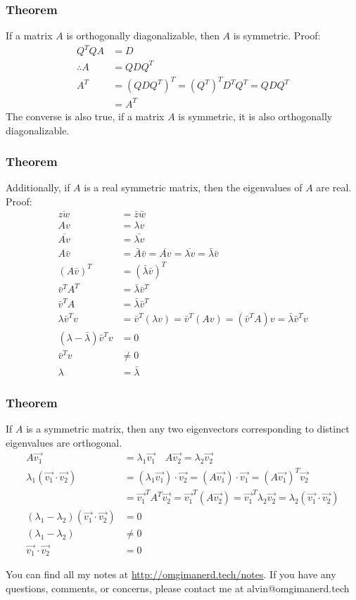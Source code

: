 \documentclass{math}
\begin{document}
\subsubsection*{Theorem}
If a matrix \( A \) is orthogonally diagonalizable, then \( A \) is symmetric.
Proof:
\begin{align*}
  Q^TQA &= D \\
  \therefore A &= QDQ^T \\
  A^T &= (QDQ^T)^T = (Q^T)^TD^TQ^T = QDQ^T \\
  &= A^T
\end{align*}
The converse is also true, if a matrix \( A \) is symmetric, it is also
orthogonally diagonalizable.

\subsubsection*{Theorem}
Additionally, if \( A \) is a real symmetric matrix, then the eigenvalues of
\( A \) are real. Proof:
\begin{align*}
  \overline{zw} &= \bar{z}\bar{w} \\
  Av &= \lambda v \\
  \overline{Av} &= \bar{\lambda v} \\
  A\bar{v} &= \bar{A}\bar{v} = \overline{Av} = \overline{\lambda v} =
    \bar{\lambda}\bar{v} \\
  (A\bar{v})^T &= (\bar{\lambda}\bar{v})^T \\
  \bar{v}^TA^T &= \bar{\lambda}\bar{v}^T \\
  \bar{v}^TA &= \bar{\lambda}\bar{v}^T \\
  \lambda\bar{v}^Tv &= \bar{v}^T(\lambda v) = \bar{v}^T(Av) = (\bar{v}^TA)v =
    \bar{\lambda}\bar{v}^Tv \\
  (\lambda-\bar{\lambda})\bar{v}^Tv &= 0 \\
  \bar{v}^Tv &\ne 0 \\
  \lambda &= \bar{\lambda}
\end{align*}

\subsubsection*{Theorem}
If \( A \) is a symmetric matrix, then any two eigenvectors corresponding to
distinct eigenvalues are orthogonal.
\begin{align*}
  A\vec{v_1} &= \lambda_1\vec{v_1} \quad A\vec{v_2} = \lambda_2\vec{v_2} \\
  \lambda_1(\vec{v_1}\cdot\vec{v_2}) &= (\lambda_1\vec{v_1})\cdot\vec{v_2} =
    (A\vec{v_1})\cdot\vec{v_1} = (A\vec{v_1})^T\vec{v_2} \\
  &= \vec{v_1}^TA^T\vec{v_2} = \vec{v_1}^T(A\vec{v_2}) =
    \vec{v_1}^T\lambda_2\vec{v_2} = \lambda_2(\vec{v_1}\cdot\vec{v_2}) \\
  (\lambda_1-\lambda_2)(\vec{v_1}\cdot\vec{v_2}) &= 0 \\
  (\lambda_1-\lambda_2) &\ne 0 \\
  \vec{v_1}\cdot\vec{v_2} &= 0
\end{align*}

\begin{center}
  You can find all my notes at \url{http://omgimanerd.tech/notes}. If you have
  any questions, comments, or concerns, please contact me at
  alvin@omgimanerd.tech
\end{center}
\end{document}

